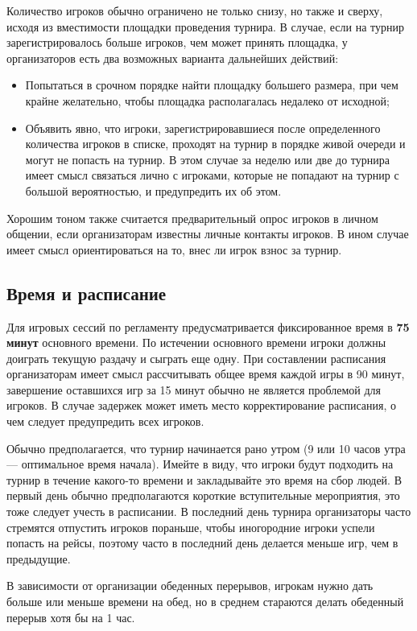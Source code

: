 Количество игроков обычно ограничено не только снизу, но также и сверху, исходя из вместимости площадки проведения турнира. В случае, если на турнир зарегистрировалось больше игроков, чем может принять площадка, у организаторов есть два возможных варианта дальнейших действий:
\begin{itemize}
	\item Попытаться в срочном порядке найти площадку большего размера, при чем крайне желательно, чтобы площадка располагалась недалеко от исходной;
	\item Объявить явно, что игроки, зарегистрировавшиеся после определенного количества игроков в списке, проходят на турнир в порядке живой очереди и могут не попасть на турнир. В этом случае за неделю или две до турнира имеет смысл связаться лично с игроками, которые не попадают на турнир с большой вероятностью, и предупредить их об этом.
\end{itemize}

Хорошим тоном также считается предварительный опрос игроков в личном общении, если организаторам известны личные контакты игроков. В ином случае имеет смысл ориентироваться на то, внес ли игрок взнос за турнир.

\subsection{Время и расписание}

Для игровых сессий по регламенту предусматривается фиксированное время в \textbf{75 минут} основного времени. По истечении основного времени игроки должны доиграть текущую раздачу и сыграть еще одну. При составлении расписания организаторам имеет смысл рассчитывать общее время каждой игры в 90 минут, завершение оставшихся игр за 15 минут обычно не является проблемой для игроков. В случае задержек может иметь место корректирование расписания, о чем следует предупредить всех игроков.

Обычно предполагается, что турнир начинается рано утром (9 или 10 часов утра --- оптимальное время начала). Имейте в виду, что игроки будут подходить на турнир в течение какого-то времени и закладывайте это время на сбор людей. В первый день обычно предполагаются короткие вступительные мероприятия, это тоже следует учесть в расписании. В последний день турнира организаторы часто стремятся отпустить игроков пораньше, чтобы иногородние игроки успели попасть на рейсы, поэтому часто в последний день делается меньше игр, чем в предыдущие.

В зависимости от организации обеденных перерывов, игрокам нужно дать больше или меньше времени на обед, но в среднем стараются делать обеденный перерыв хотя бы на 1 час.

